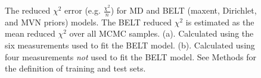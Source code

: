 \documentclass[11pt,titlepage]{article}
\begin{document}
\begin{figure}
\caption{
The reduced $\chi^2$ error (e.g. $\frac{\chi^2}{n}$) for MD and BELT (maxent, Dirichlet, and MVN priors) models.  The BELT reduced $\chi^2$ is estimated as the mean reduced $\chi^2$ over all MCMC samples.  (a).  Calculated using the six measurements used to fit the BELT model.  (b).  Calculated using four measurements \emph{not} used to fit the BELT model.  See Methods for the definition of training and test sets.
}
\label{figure:ChiSquared}
\end{figure}
\end{document}

